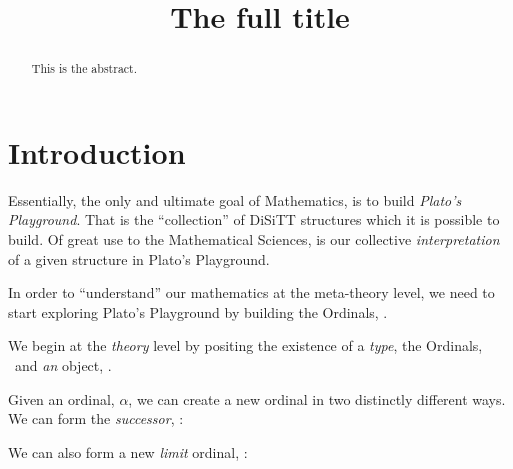 \documentclass[a4paper]{amsart}
\begin{document}
\sloppy

\title[A short title]{The full title}

%

\begin{abstract}
This is the abstract.
\end{abstract}
\maketitle
\tableofcontents

\section{Introduction}

Essentially, the only and ultimate goal of Mathematics, is to build
\emph{Plato's Playground}. That is the ``collection'' of DiSiTT structures which
it is possible to build. Of great use to the Mathematical Sciences, is our
collective \emph{interpretation} of a given structure in Plato's Playground.

In order to ``understand'' our mathematics at the meta-theory level, we need to
start exploring Plato's Playground by building the Ordinals, \Ordinal.

We begin at the \emph{theory} level by positing the existence of a \emph{type},
the Ordinals, \Ordinal\ and \emph{an} object, \judgement{\zero}{\Ordinal}.

\begin{deAxiom}
\conclusion{}{\judgement{\Ordinal}{\Universe}}
\end{deAxiom}

\begin{deAxiom}
\conclusion{}{\judgement{\zero}{\Ordinal_{\cdot}}}
\end{deAxiom}

Given an ordinal, $\alpha$, we can create a new ordinal in two distinctly
different ways. We can form the \emph{successor}, \successor{\alpha}:

\begin{deAxiom}
\hypothesis{\Gamma}{\judgement{\alpha}{\Ordinal}}
\conclusion{\Gamma}{\judgement{\successor{\alpha}}{\Ordinal}}
\end{deAxiom}

We can also form a new \emph{limit} ordinal, \limitOrd{\alpha}:

\begin{deAxiom}
\hypothesis{\Gamma}{\judgement{\alpha}{\Ordinal}}
\conclusion{\Gamma}{\judgement{\limitOrd{\alpha}}{\Ordinal}}
\end{deAxiom}
\end{document}
